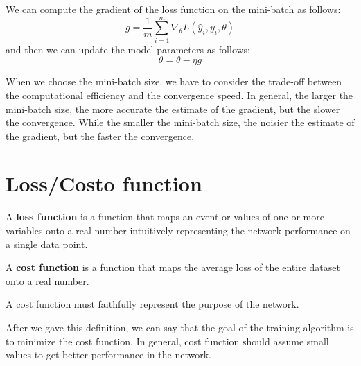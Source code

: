 We can compute the gradient of the loss function on the mini-batch as follows:
\begin{equation}
    g = \frac{1}{m} \sum_{i = 1}^{m} \nabla_{\theta} L(\hat{y}_i, y_i, \theta)
\end{equation}
and then we can update the model parameters as follows:
\begin{equation}
    \theta = \theta - \eta g
\end{equation}

When we choose the mini-batch size, we have to consider the trade-off between
the computational efficiency and the convergence speed. In general, the larger
the mini-batch size, the more accurate the estimate of the gradient, but the
slower the convergence. While the smaller the mini-batch size, the noisier the
estimate of the gradient, but the faster the convergence.
\section{Loss/Costo function}
\begin{definition}
    A \textbf{loss function} is a function that maps an event or values of one
    or more variables onto a real number intuitively representing the network
    performance on a single data point.
\end{definition}
\begin{definition}
    A \textbf{cost function} is a function that maps the average loss of the
    entire dataset onto a real number.

    A cost function must faithfully represent the purpose of the network.
\end{definition}

After we gave this definition, we can say that the goal of the training algorithm
is to minimize the cost function. In general, cost function should assume small 
values to get better performance in the network.

